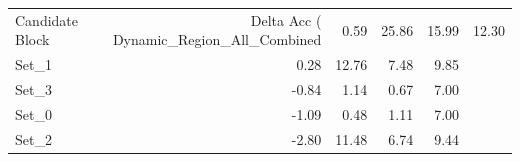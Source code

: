 \begin{tabular}{lrrrr}
\toprule
Candidate Block & Delta Acc (%
\midrule
Dynamic_Region_All_Combined & 0.59 & 25.86 & 15.99 & 12.30 \\
Set_1 & 0.28 & 12.76 & 7.48 & 9.85 \\
Set_3 & -0.84 & 1.14 & 0.67 & 7.00 \\
Set_0 & -1.09 & 0.48 & 1.11 & 7.00 \\
Set_2 & -2.80 & 11.48 & 6.74 & 9.44 \\
\bottomrule
\end{tabular}
